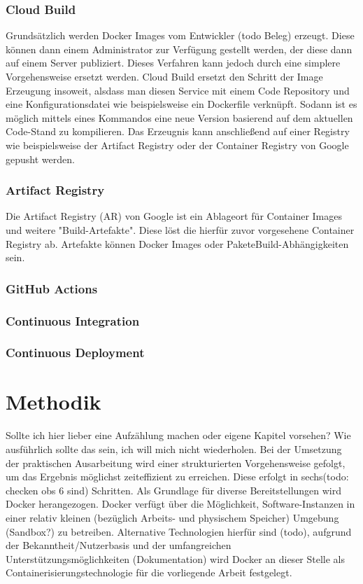 \documentclass[pdftex,a4paper,abstracton,11pt,parskip=half,bibtotocnumbered]{scrartcl}
\begin{document}
		\subsubsection{Cloud Build}
			Grundsätzlich werden Docker Images vom Entwickler (todo Beleg) erzeugt. Diese können dann einem Administrator zur Verfügung gestellt werden, der 
			diese dann auf einem Server publiziert. Dieses Verfahren kann jedoch durch eine simplere Vorgehensweise ersetzt werden. Cloud Build ersetzt den Schritt der Image 
			Erzeugung insoweit, alsdass man diesen Service mit einem Code Repository und eine Konfigurationsdatei wie beispielsweise ein Dockerfile verknüpft. 
			Sodann ist es möglich mittels eines Kommandos eine neue Version basierend auf dem aktuellen Code-Stand zu kompilieren. Das Erzeugnis kann 
			anschließend auf einer Registry wie beispielsweise der Artifact Registry oder der Container Registry von Google gepusht werden. 

		\subsubsection{Artifact Registry}
			Die Artifact Registry (AR) von Google ist ein Ablageort für Container Images und weitere "Build-Artefakte". Diese löst die hierfür zuvor vorgesehene Container Registry ab.
			Artefakte können Docker Images oder PaketeBuild-Abhängigkeiten sein. \cite[vgl.][]{martinez_2020} 
			
		\subsubsection{GitHub Actions}
		\subsubsection{Continuous Integration}
		\subsubsection{Continuous Deployment}

\section{Methodik}
	Sollte ich hier lieber eine Aufzählung machen oder eigene Kapitel vorsehen? Wie ausführlich sollte das sein, ich will mich nicht wiederholen. 
	Bei der Umsetzung der praktischen Ausarbeitung wird einer strukturierten Vorgehensweise gefolgt, um das Ergebnis möglichst zeiteffizient zu 
	erreichen. Diese erfolgt in sechs(todo: checken obs 6 sind) Schritten.
	Als Grundlage für diverse Bereitstellungen wird Docker herangezogen. Docker verfügt über die Möglichkeit, Software-Instanzen in einer relativ kleinen 
	(bezüglich Arbeits- und physischem Speicher) Umgebung (Sandbox?) zu betreiben. Alternative Technologien hierfür sind (todo), aufgrund der 
	Bekanntheit/Nutzerbasis und der	umfangreichen Unterstützungsmöglichkeiten (Dokumentation) wird Docker an dieser Stelle als Containerisierungstechnologie
	für die vorliegende Arbeit festgelegt.  
\end{document}
